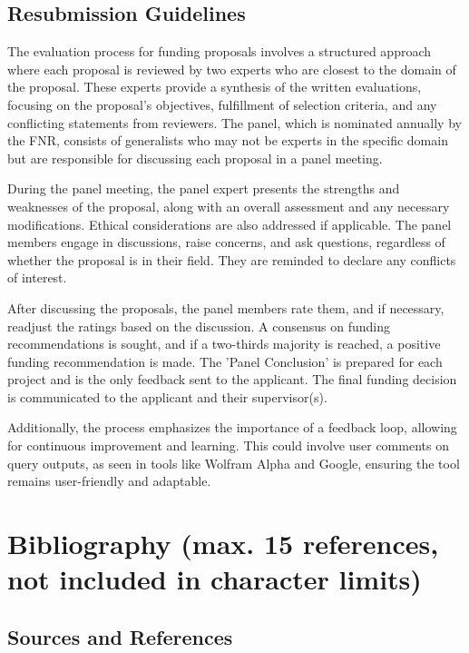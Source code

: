\documentclass{article}
\begin{document}
\subsection{Resubmission Guidelines}

The evaluation process for funding proposals involves a structured approach where each proposal is reviewed by two experts who are closest to the domain of the proposal. These experts provide a synthesis of the written evaluations, focusing on the proposal's objectives, fulfillment of selection criteria, and any conflicting statements from reviewers. The panel, which is nominated annually by the FNR, consists of generalists who may not be experts in the specific domain but are responsible for discussing each proposal in a panel meeting.

During the panel meeting, the panel expert presents the strengths and weaknesses of the proposal, along with an overall assessment and any necessary modifications. Ethical considerations are also addressed if applicable. The panel members engage in discussions, raise concerns, and ask questions, regardless of whether the proposal is in their field. They are reminded to declare any conflicts of interest.

After discussing the proposals, the panel members rate them, and if necessary, readjust the ratings based on the discussion. A consensus on funding recommendations is sought, and if a two-thirds majority is reached, a positive funding recommendation is made. The 'Panel Conclusion' is prepared for each project and is the only feedback sent to the applicant. The final funding decision is communicated to the applicant and their supervisor(s).

Additionally, the process emphasizes the importance of a feedback loop, allowing for continuous improvement and learning. This could involve user comments on query outputs, as seen in tools like Wolfram Alpha and Google, ensuring the tool remains user-friendly and adaptable.

\section{Bibliography (max. 15 references, not included in character limits)}

\subsection{Sources and References}
\end{document}
